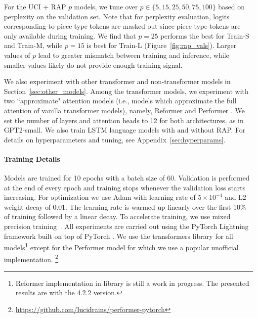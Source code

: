 For the UCI + RAP $p$ models, we tune over $p \in \{5, 15, 25, 50, 75, 100\}$ based on %
perplexity on the validation set.
Note that for perplexity evaluation, logits corresponding to piece type tokens are masked out since piece type tokens are only available during training.
We find that $p=25$ performs the best for Train-S and Train-M, while $p=15$ is best for Train-L (Figure~\ref{fig:rap_vals}). %
Larger values of $p$ lead to greater mismatch between training and inference, while smaller values likely do not provide enough training signal.

We also experiment with other transformer and non-transformer models in Section~\ref{sec:other_models}.
Among the transformer models, we experiment with two ``approximate" attention models (i.e., models which approximate the full attention of vanilla transformer models), namely, Reformer \cite{kitaev2020reformer} and Performer \cite{choromanski2021rethinking}.  
We set the number of layers and attention heads to 12 for both 
architectures, as in GPT2-small.
We also train LSTM language models with and without RAP. 
For details on hyperparameters and tuning, see Appendix~\ref{sec:hyperparams}.


\paragraph{Training Details}
Models are trained for 10 epochs with a batch size of 60. Validation is performed %
 at the end of every epoch and training stops whenever the validation loss starts increasing.
For optimization we use Adam \citep{kingma2014adam} with learning rate of $5\times10^{-4}$ and L2 weight decay of $0.01$.
The learning rate is warmed up linearly over the first 10\% of training followed by a linear decay.
To accelerate training, we use mixed precision training~\citep{micikevicius2018mixed}. %
All experiments are carried out using the PyTorch Lightning framework %
built on top of PyTorch \citep{falcon2019pytorch, pytorch}.
We use the transformers library \citep{Wolf2019HuggingFacesTS} for all models\footnote{Reformer implementation in  library is still a work in progress. The presented results are with the 4.2.2 version.} %
except for the Performer model %
for which we use a popular unofficial implementation.
\footnote{\url{https://github.com/lucidrains/performer-pytorch}}








